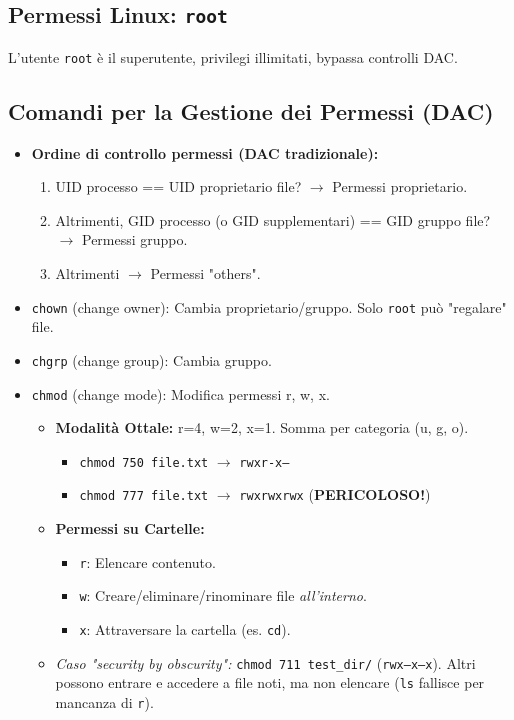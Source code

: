 \subsection{Permessi Linux: \texttt{root}}
L'utente \texttt{root} è il superutente, privilegi illimitati, bypassa controlli DAC.

\subsection{Comandi per la Gestione dei Permessi (DAC)}
\begin{itemize}
    \item \textbf{Ordine di controllo permessi (DAC tradizionale):}
    \begin{enumerate}
        \item UID processo == UID proprietario file? $\rightarrow$ Permessi proprietario.
        \item Altrimenti, GID processo (o GID supplementari) == GID gruppo file? $\rightarrow$ Permessi gruppo.
        \item Altrimenti $\rightarrow$ Permessi "others".
    \end{enumerate}
    \item \texttt{chown} (change owner): Cambia proprietario/gruppo. Solo \texttt{root} può "regalare" file.
    \item \texttt{chgrp} (change group): Cambia gruppo.
    \item \texttt{chmod} (change mode): Modifica permessi r, w, x.
    \begin{itemize}
        \item \textbf{Modalità Ottale:} r=4, w=2, x=1. Somma per categoria (u, g, o).
        \begin{itemize}
            \item \texttt{chmod 750 file.txt} $\rightarrow$ \texttt{rwxr-x---}
            \item \texttt{chmod 777 file.txt} $\rightarrow$ \texttt{rwxrwxrwx} (\textbf{PERICOLOSO!})
        \end{itemize}
        \item \textbf{Permessi su Cartelle:}
        \begin{itemize}
            \item \texttt{r}: Elencare contenuto.
            \item \texttt{w}: Creare/eliminare/rinominare file \textit{all'interno}.
            \item \texttt{x}: Attraversare la cartella (es. \texttt{cd}).
        \end{itemize}
        \item \textit{Caso "security by obscurity":} \texttt{chmod 711 test\_dir/} (\texttt{rwx--x--x}). Altri possono entrare e accedere a file noti, ma non elencare (\texttt{ls} fallisce per mancanza di \texttt{r}).
    \end{itemize}
\end{itemize}

